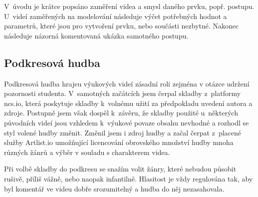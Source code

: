 V~úvodu je krátce popsáno zaměření videa a smysl daného prvku, popř. postupu.
U~videí zaměřených na modelování následuje výčet potřebných hodnot a parametrů, které jsou pro vytvoření prvku, nebo součásti nezbytné.
Nakonec následuje názorná komentovaná ukázka samotného postupu.

\subsection{Podkresová hudba}
Podkresová hudba hrajeu výukových videí zásadní roli zejména v otázce udržení pozornosti studenta.
V~samotných začátcích jsem čerpal skladby z~platformy ncs.io, která poskytuje skladby k~volnému užití za předpokladu uvedení autora a zdroje.
Postupně jsem však dospěl k~závěru, že skladby použité u~některých původních videí jsou vzhledem k~výukové povaze obsahu nevhodné a rozhodl se styl volené hudby změnit. 
Změnil jsem i zdroj hudby a začal čerpat z~placené služby Artlist.io umožňující licencování obrovského množství hudby mnoha různých žánrů a výběr v souladu s charakterem videa.

Při volbě skladby do podkresu se snažím volit žánry, které nebudou působit rušivě, příliš vážně, nebo naopak infantilně.
Hlasitost je vždy regulována tak, aby byl komentář ve videu dobře srozumitelný a hudba do něj nezasahovala.


